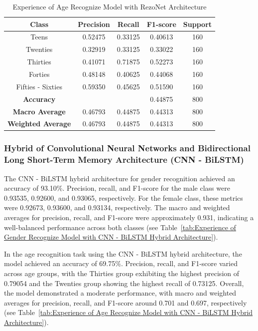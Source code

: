 \documentclass[conference, 10pt,onecolumn]{IEEEtran}
\begin{document}
\begin{table}[htbp]
    \centering
    \begin{tabular}{|c|cccc|}
        \hline
        \textbf{Class} & \textbf{Precision} & \textbf{Recall} & \textbf{F1-score} & \textbf{Support} \\
        \hline
        Teens & 0.52475 & 0.33125 & 0.40613 & 160 \\
        Twenties & 0.32919 & 0.33125 & 0.33022 & 160 \\
        Thirties & 0.41071 & 0.71875 & 0.52273 & 160 \\
        Forties & 0.48148 & 0.40625 & 0.44068 & 160 \\
        Fifties - Sixties& 0.59350 & 0.45625 & 0.51590 & 160 \\
        \hline
        \textbf{Accuracy} &  &  & 0.44875 & 800 \\
        \textbf{Macro Average} & 0.46793 & 0.44875 & 0.44313 & 800 \\
        \textbf{Weighted Average} & 0.46793 & 0.44875 & 0.44313  & 800 \\
        \hline
    \end{tabular}
    \caption{Experience of Age Recognize Model with RezoNet Architecture}
    \label{tab:Experience of Age Recognize Model with RezoNet Architecture}
\end{table}

\subsubsection{Hybrid of Convolutional Neural Networks and Bidirectional Long Short-Term Memory Architecture (CNN - BiLSTM)}
The CNN - BiLSTM hybrid architecture for gender recognition achieved an accuracy of 93.10\%. Precision, recall, and F1-score for the male class were 0.93535, 0.92600, and 0.93065, respectively. For the female class, these metrics were 0.92673, 0.93600, and 0.93134, respectively. The macro and weighted averages for precision, recall, and F1-score were approximately 0.931, indicating a well-balanced performance across both classes (see Table~\ref{tab:Experience of Gender Recognize Model with CNN - BiLSTM Hybrid Architecture}).

In the age recognition task using the CNN - BiLSTM hybrid architecture, the model achieved an accuracy of 69.75\%. Precision, recall, and F1-score varied across age groups, with the Thirties group exhibiting the highest precision of 0.79054 and the Twenties group showing the highest recall of 0.73125. Overall, the model demonstrated a moderate performance, with macro and weighted averages for precision, recall, and F1-score around 0.701 and 0.697, respectively (see Table~\ref{tab:Experience of Age Recognize Model with CNN - BiLSTM Hybrid Architecture}).
\end{document}
